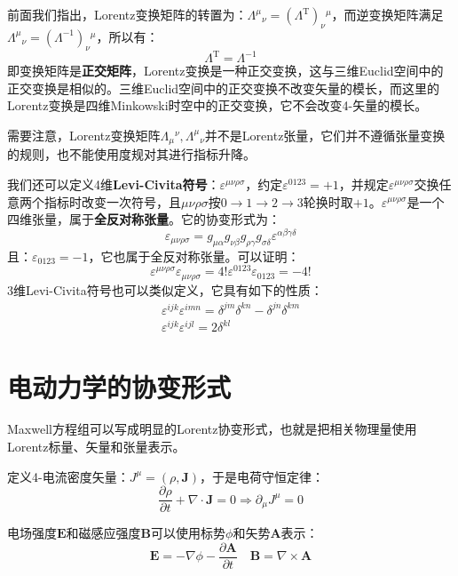 \documentclass{book}
\begin{document}
前面我们指出，Lorentz变换矩阵的转置为：$\Lambda^\mu{}_\nu=(\Lambda^\mathrm{T})_\nu{}^\mu$，而逆变换矩阵满足$\Lambda^\mu{}_\nu=(\Lambda^{-1})_\nu{}^\mu$，所以有：
\begin{equation}
	\Lambda^\mathrm{T}=\Lambda^{-1}
\end{equation}
即变换矩阵是\textbf{正交矩阵}，Lorentz变换是一种正交变换，这与三维Euclid空间中的正交变换是相似的。三维Euclid空间中的正交变换不改变矢量的模长，而这里的Lorentz变换是四维Minkowski时空中的正交变换，它不会改变4-矢量的模长。

需要注意，Lorentz变换矩阵$\Lambda_\mu{}^\nu,\Lambda^\mu{}_\nu$并不是Lorentz张量，它们并不遵循张量变换的规则，也不能使用度规对其进行指标升降。

我们还可以定义4维\textbf{Levi-Civita符号}：$\varepsilon^{\mu\nu\rho\sigma}$，约定$\varepsilon^{0123}=+1$，并规定$\varepsilon^{\mu\nu\rho\sigma}$交换任意两个指标时改变一次符号，且$\mu\nu\rho\sigma$按$0\to1\to2\to3$轮换时取$+1$。$\varepsilon^{\mu\nu\rho\sigma}$是一个四维张量，属于\textbf{全反对称张量}。它的协变形式为：
\begin{equation}
\varepsilon_{\mu\nu\rho\sigma}=g_{\mu\alpha}g_{\nu\beta}g_{\rho\gamma}g_{\sigma\delta}{\varepsilon}^{\alpha\beta\gamma\delta}	
\end{equation}
且：$\varepsilon_{0123}=-1$，它也属于全反对称张量。可以证明：
\begin{equation}
	\varepsilon^{\mu\nu\rho\sigma}\varepsilon_{\mu\nu\rho\sigma}=4!\varepsilon^{0123}\varepsilon_{0123}=-4!
\end{equation}
3维Levi-Civita符号也可以类似定义，它具有如下的性质：
\begin{gather}
    \varepsilon^{ijk}\varepsilon^{imn}=\delta^{jm}\delta^{kn}-\delta^{jn}\delta^{km} \\
\varepsilon^{ijk}\varepsilon^{ijl}=2\delta^{kl}
\end{gather}
\section{电动力学的协变形式}
Maxwell方程组可以写成明显的Lorentz协变形式，也就是把相关物理量使用Lorentz标量、矢量和张量表示。

定义4-电流密度矢量：$J^\mu=(\rho,\mathbf{J})$，于是电荷守恒定律：
\begin{equation}
	\frac{\partial\rho}{\partial t}+\nabla\cdot\mathbf{J}=0\Rightarrow \partial_\mu J^\mu=0
\end{equation}

电场强度$\mathbf{E}$和磁感应强度$\mathbf{B}$可以使用标势$\phi$和矢势$\mathbf{A}$表示：
\begin{equation}
	\mathbf{E}=-\nabla\phi-\frac{\partial\mathbf{A}}{\partial t}\quad\mathbf{B}=\nabla\times\mathbf{A}
\end{equation}
\end{document}
